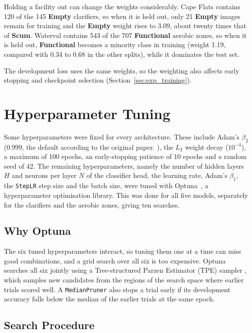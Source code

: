 Holding a facility out can change the weights considerably. Cape Flats contains 120 of the 145 \textbf{Empty} clarifiers, so when it is held out, only 21 \textbf{Empty} images remain for training and the \textbf{Empty} weight rises to 3.09, about twenty times that of \textbf{Scum}. Waterval contains 543 of the 707 \textbf{Functional} aerobic zones, so when it is held out, \textbf{Functional} becomes a minority class in training (weight 1.19, compared with 0.34 to 0.68 in the other splits), while it dominates the test set.

The development loss uses the same weights, so the weighting also affects early stopping and checkpoint selection (Section~\ref{sec:exp_training}).


\section{Hyperparameter Tuning}
\label{sec:exp_hyperparams}

Some hyperparameters were fixed for every architecture. These include Adam's $\beta_2$ ($0.999$, the default according to the original paper. \citep{kingma2015adam}), the $L_2$ weight decay ($10^{-4}$), a maximum of 100 epochs, an early-stopping patience of 10 epochs and a random seed of 42. The remaining hyperparameters, namely the number of hidden layers $H$ and neurons per layer $N$ of the classifier head, the learning rate, Adam's $\beta_1$, the \texttt{StepLR} step size and the batch size, were tuned with Optuna~\citep{akiba2019optuna}, a hyperparameter optimisation library. This was done for all five models, separately for the clarifiers and the aerobic zones, giving ten searches.

\subsection{Why Optuna}
\label{subsec:why_optuna}

The six tuned hyperparameters interact, so tuning them one at a time can miss good combinations, and a grid search over all six is too expensive. Optuna searches all six jointly using a Tree-structured Parzen Estimator (TPE) sampler \citep{bergstra2011tpe}, which samples new candidates from the regions of the search space where earlier trials scored well. A \texttt{MedianPruner} also stops a trial early if its development accuracy falls below the median of the earlier trials at the same epoch.

\subsection{Search Procedure}
\label{subsec:search_procedure}

